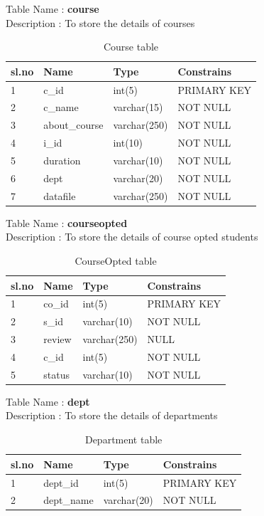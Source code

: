 \begin{table}[!h]
Table Name    :    {\bf course}\\
Description      :  To store the details of courses


\begin{tabular}{|l|l|l|l|}
\hline
\bf sl.no & \bf Name          & \bf Type         & \bf Constrains  \\ 
\hline
1     & c\_id         & int(5)       & PRIMARY KEY \\ 
\hline
2     & c\_name       & varchar(15)  &    NOT NULL  \\ 
\hline
3     & about\_course & varchar(250) &  NOT NULL     \\ 
\hline
4     & i\_id         & int(10)      &       NOT NULL      \\ 
\hline
5     & duration      & varchar(10)  &     NOT NULL        \\ 
\hline
6     & dept          & varchar(20)  &       NOT NULL      \\ 
\hline
7     & datafile      & varchar(250) &    NOT NULL         \\ 
\hline
\end{tabular}
\caption{Course table}
\end{table}

\begin{table}[!h]
Table Name    :    {\bf courseopted}\\
Description      :  To store the details of course opted students


\begin{tabular}{|l|l|l|l|}
\hline
\bf sl.no & \bf Name   & \bf Type         & \bf Constrains  \\ 
\hline
1     & co\_id & int(5)       & PRIMARY KEY \\
 \hline
2     & s\_id  & varchar(10)  &       NOT NULL      \\ 
\hline
3     & review & varchar(250) &     NULL        \\ 
\hline
4     & c\_id  & int(5)       &    NOT NULL         \\ 
\hline
5     & status & varchar(10)  &    NOT NULL         \\ 
\hline
\end{tabular}
\caption{CourseOpted table}
\end{table}

\begin{table}[!h]
Table Name    :    {\bf dept}\\
Description      :  To store the details of departments


\begin{tabular}{|l|l|l|l|}
\hline
\bf sl.no & \bf Name       & \bf Type        & \bf Constrains  \\ 
\hline
1     & dept\_id   & int(5)      & PRIMARY KEY \\ 
\hline
2     & dept\_name & varchar(20) &      NOT NULL       \\ 
\hline
\end{tabular}
\caption{Department table}
\end{table}

